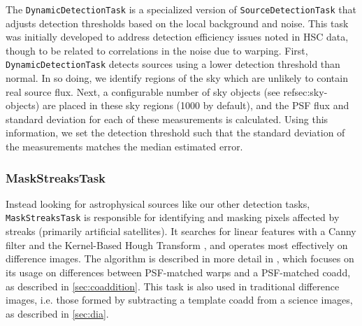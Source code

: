The \texttt{DynamicDetectionTask} is a specialized version of \texttt{SourceDetectionTask} that adjusts detection thresholds based on the local background and noise.
This task was initially developed to address detection efficiency issues noted in HSC data, though to be related to correlations in the noise due to warping.
First, \texttt{DynamicDetectionTask} detects sources using a lower detection threshold than normal.
In so doing, we identify regions of the sky which are unlikely to contain real source flux.
Next, a configurable number of sky objects (see ref{sec:sky-objects}) are placed in these sky regions (1000 by default), and the PSF flux and standard deviation for each of these measurements is calculated.
Using this information, we set the detection threshold such that the standard deviation of the measurements matches the median estimated error.

\subsubsection{MaskStreaksTask}
\label{sec:MaskStreaksTask}

Instead looking for astrophysical sources like our other detection tasks, \texttt{MaskStreaksTask} is responsible for identifying and masking pixels affected by streaks (primarily artificial satellites).
It searches for linear features with a Canny filter and the Kernel-Based Hough Transform \citep{2008PatRe..41..299F}, and operates most effectively on difference images.
The algorithm is described in more detail in \citet{DMTN-197}, which focuses on its usage on differences between PSF-matched warps and a PSF-matched coadd, as described in \ref{sec:coaddition}.
This task is also used in traditional difference images, i.e. those formed by subtracting a template coadd from a science images, as described in \ref{sec:dia}.
